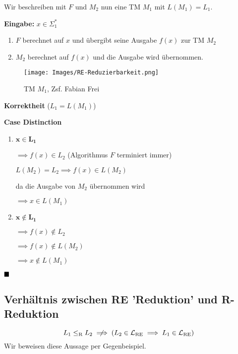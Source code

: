             Wir beschreiben mit $F$ und $M_2$ nun eine TM $M_1$ mit $L(M_1) = L_1$.
            
            \textbf{Eingabe:} $x \in \Sigma_1^*$
            \begin{enumerate}[label=\arabic*.]
                \item $F$ berechnet auf $x$ und übergibt seine Ausgabe $f(x)$ zur TM $M_2$
                \item $M_2$ berechnet auf $f(x)$ und die Ausgabe wird übernommen.
            \end{enumerate}
        
            \begin{figure}[htp]
                \texttt{[image: Images/RE-Reduzierbarkeit.png]}
                \caption{TM $M_1$, Zsf. Fabian Frei}
            \end{figure}
        
            \textbf{Korrektheit} ($L_1 = L(M_1)$)
            
            \textbf{Case Distinction}
            \begin{enumerate}[label=\Roman*.]
                \item $\mathbf{x \in L_1}$
                
                $\implies f(x) \in L_2$  (Algorithmus $F$ terminiert immer)
        
                $L(M_2) = L_2 \implies f(x) \in L(M_2)$ 
                
                da die Ausgabe von $M_2$ übernommen wird
                
                $\implies x \in L(M_1)$
                \item $\mathbf{x \notin L_1}$
                
                $\implies f(x) \notin L_2$
        
                $\implies f(x) \notin L(M_2)$
        
                $\implies x \notin L(M_1)$
            \end{enumerate}
            $\hfill\blacksquare$
        
            \subsection{Verhältnis zwischen RE 'Reduktion' und R-Reduktion}
            
            $$L_1 \leq_{\text{R}} L_2 \centernot{\implies} (L_2 \in \Lre \implies L_1 \in \Lre)$$
            Wir beweisen diese Aussage per Gegenbeispiel. 
        
